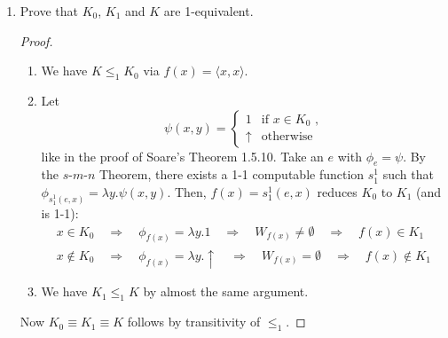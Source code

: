 \documentclass[a4paper,11pt]{article}
\begin{document}
\begin{enumerate}
\item %
Prove that $K_0$, $K_1$ and $K$ are 1-equivalent.

\begin{proof}
\begin{enumerate}
\item We have $K \leq_1 K_0$ via $f(x) = \langle x,x \rangle$.
\item Let
  \begin{equation*}
    \psi(x, y) = \begin{cases}
      1        & \text{if $x \in K_0$ ,}\\
      \uparrow & \text{otherwise}
    \end{cases}
  \end{equation*}
  like in the proof of Soare's Theorem 1.5.10.
  Take an $e$ with $\phi_e = \psi$.
  By the $s$-$m$-$n$ Theorem, there exists a 1-1 computable function $s^1_1$ such that
  $\phi_{s^1_1(e, x)} = \lambda y. \psi(x, y)$. Then, $f(x) = s^1_1(e, x)$ reduces $K_0$
  to $K_1$ (and is 1-1):
  \begin{align*}
    x \in K_0 \quad \Rightarrow \quad \phi_{f(x)} = \lambda y.1 \quad \Rightarrow \quad W_{f(x)} \neq \emptyset \quad \Rightarrow \quad f(x) \in K_1\\
    x \notin K_0 \quad \Rightarrow \quad \phi_{f(x)} = \lambda y.\uparrow \quad \Rightarrow \quad W_{f(x)} = \emptyset \quad \Rightarrow \quad f(x) \notin K_1
  \end{align*}
\item We have $K_1 \leq_1 K$ by almost the same argument.
\end{enumerate}
Now $K_0 \equiv K_1 \equiv K$ follows by transitivity of $\leq_1$.
\end{proof}


\end{enumerate}
\end{document}
